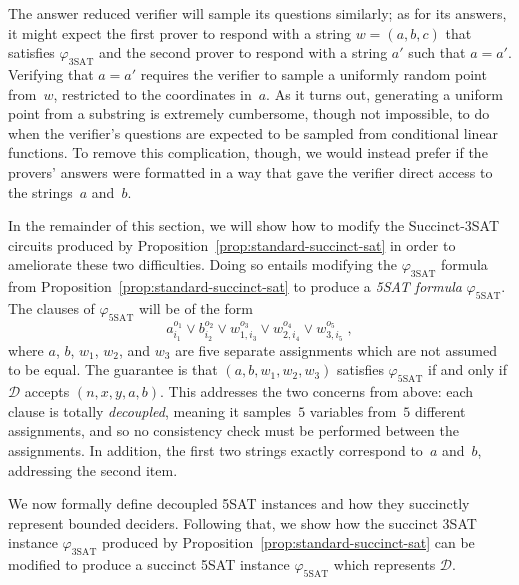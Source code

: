 \documentclass[11pt]{article}
\theoremstyle{definition}
\newcommand{\decider}{\mathcal{D}}
\begin{document}
\begin{enumerate}
	The answer reduced verifier will sample its questions similarly; as for its
  answers, it might expect the first prover to respond with a string $w = (a, b,
  c)$ that satisfies $\varphi_{\mathrm{3SAT}}$ and the second prover to respond
  with a string $a'$ such that $a = a'$.
	Verifying that $a = a'$ requires the verifier to sample a uniformly random
  point from~$w$, restricted to the coordinates in~$a$.
	As it turns out, generating a uniform point from a substring is extremely
  cumbersome, though not impossible, to do when the verifier's questions are
  expected to be sampled from conditional linear functions.
	To remove this complication, though, we would instead prefer if the provers'
  answers were formatted in a way that gave the verifier direct access to the
  strings~$a$ and~$b$.
\end{enumerate}
  
In the remainder of this section, we will show how to modify the Succinct-3SAT
circuits produced by Proposition~\ref{prop:standard-succinct-sat} in order to
ameliorate these two difficulties.
Doing so entails modifying the $\varphi_{\mathrm{3SAT}}$ formula from
Proposition~\ref{prop:standard-succinct-sat} to produce a \emph{5SAT formula}
$\varphi_{\mathrm{5SAT}}$.
The clauses of $\varphi_{\mathrm{5SAT}}$ will be of the form
\begin{equation*}
  a_{i_1}^{o_1} \lor b_{i_2}^{o_2} \lor w_{1, i_3}^{o_3}
  \lor w_{2, i_4}^{o_4} \lor w_{3, i_5}^{o_5}\;,
\end{equation*}
where $a$, $b$, $w_1$, $w_2$, and $w_3$ are five separate assignments which are
not assumed to be equal.
The guarantee is that $(a, b, w_1, w_2, w_3)$ satisfies
$\varphi_{\mathrm{5SAT}}$ if and only if $\decider$ accepts $(n, x, y, a, b)$.
This addresses the two concerns from above: each clause is totally
\emph{decoupled}, meaning it samples~$5$ variables from~$5$ different
assignments, and so no consistency check must be performed between the
assignments.
In addition, the first two strings exactly correspond to~$a$ and~$b$, addressing
the second item.

We now formally define decoupled 5SAT instances and how they succinctly
represent bounded deciders.
Following that, we show how the succinct 3SAT instance $\varphi_{\mathrm{3SAT}}$
produced by Proposition~\ref{prop:standard-succinct-sat} can be modified to
produce a succinct 5SAT instance $\varphi_{\mathrm{5SAT}}$ which represents
$\decider$.
\end{document}
